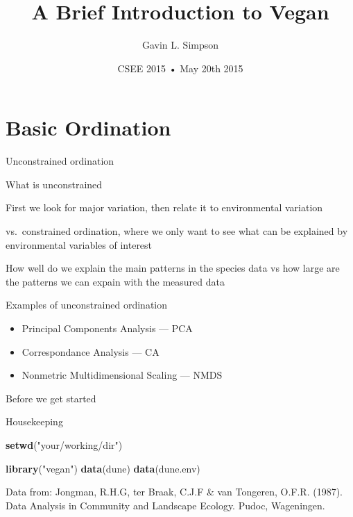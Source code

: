 \documentclass[10pt,ignorenonframetext,compress, aspectratio=169]{beamer}
\title{A Brief Introduction to Vegan}
\author{Gavin L. Simpson}
\date{CSEE 2015 • May 20th 2015}
\newenvironment{Shaded}{\begin{snugshade}}{\end{snugshade}}
\newcommand{\KeywordTok}[1]{\textcolor[rgb]{0.13,0.29,0.53}{\textbf{{#1}}}}
\newcommand{\StringTok}[1]{\textcolor[rgb]{0.31,0.60,0.02}{{#1}}}
\newcommand{\NormalTok}[1]{{#1}}
\begin{document}
\frame{\titlepage}

\section{Basic Ordination}\label{basic-ordination}

\begin{frame}{Unconstrained ordination}

What is \alert{unconstrained}

First we look for major variation, then relate it to environmental
variation

vs.~constrained ordination, where we only want to see what can be
explained by environmental variables of interest

How well do we explain the main patterns in the species data vs how
large are the patterns we can expain with the measured data

\end{frame}

\begin{frame}{Examples of unconstrained ordination}

\begin{itemize}
\itemsep1pt\parskip0pt
\item
  Principal Components Analysis --- PCA
\item
  Correspondance Analysis --- CA
\item
  Nonmetric Multidimensional Scaling --- NMDS
\end{itemize}

\end{frame}

\begin{frame}[fragile]{Before we get started}

Housekeeping

\begin{Shaded}
\begin{Highlighting}[]
\KeywordTok{setwd}\NormalTok{(}\StringTok{"your/working/dir"}\NormalTok{)}
\end{Highlighting}
\end{Shaded}

\begin{Shaded}
\begin{Highlighting}[]
\KeywordTok{library}\NormalTok{(}\StringTok{"vegan"}\NormalTok{)}
\KeywordTok{data}\NormalTok{(dune)}
\KeywordTok{data}\NormalTok{(dune.env)}
\end{Highlighting}
\end{Shaded}

Data from: Jongman, R.H.G, ter Braak, C.J.F \& van Tongeren, O.F.R.
(1987). Data Analysis in Community and Landscape Ecology. Pudoc,
Wageningen.

\end{frame}
\end{document}
